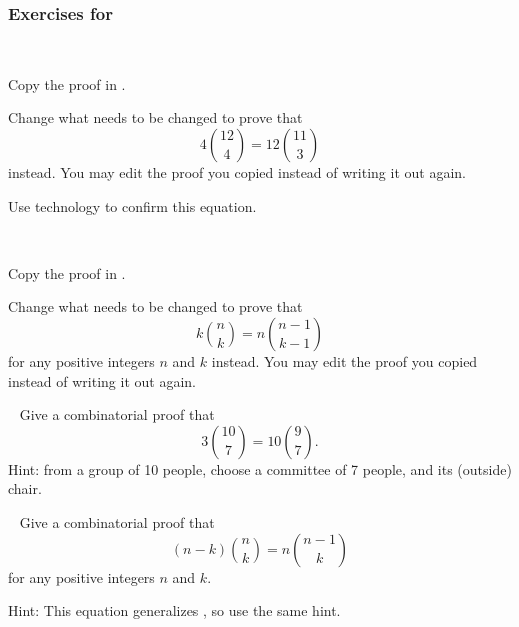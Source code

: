 
\subsubsection*{Exercises for  \subproofscountnosums}

\begin{exer} [\exerP] %
\label{exer_comb_proof_teamandleader_revisited}
~
    \begin{exerpart}
        \item Copy the proof in .
        \item Change what needs to be changed to prove that 
            $$4\binom{12}{4}=12\binom{11}{3}$$ 
        instead. You may edit the proof you copied instead of writing it out again.
        \item Use technology to confirm this equation.
    \end{exerpart}
\end{exer}

\begin{exer} [\exerP] %
\label{exer_comb_proof_teamandleader_generalized}
~
    \begin{exerpart}    
        \item Copy the proof in .
        \item Change what needs to be changed to prove that 
            $$k\binom{n}{k}=n\binom{n-1}{k-1}$$
        for any positive integers $n$ and $k$
        instead. You may edit the proof you copied instead of writing it out again.
    \end{exerpart}
\end{exer}  

\begin{exer} [\exerU] %
\label{exer_outside_chair}
~
    Give a combinatorial proof that 
        $$\displaystyle 3\binom{10}{7} = 10 \binom{9}{7}.$$
    Hint: from a group of 10 people, choose a committee of 7 people, and its (outside) chair.
\end{exer}

\begin{exer} [\exerU] %
\label{exer_outside_chair_generalized}
~
    Give a combinatorial proof that
        $$\displaystyle (n-k)\binom{n}{k} = n \binom{n-1}{k}$$
    for any positive integers $n$ and $k$.  

    Hint: This equation generalizes , so use the same hint.
\end{exer}

